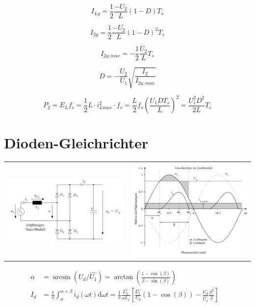 \documentclass[10pt,landscape]{scrartcl}
\newcommand{\eqn}[3]
{
  \begin{minipage}[#1]{#2}
    \[ #3 \]
  \end{minipage}
}
\begin{document}
\begin{multicols}{2}
\eqn{h}{0.3\linewidth}{ I_{Lg} = \frac{1}{2} \frac{-U_2}{L}(1-D)T_s }
\eqn{h}{0.3\linewidth}{ I_{2g} = \frac{1}{2} \frac{-U_2}{L}(1-D)^2T_s }
\eqn{h}{0.3\linewidth}{ I_{2g,max} = -\frac{1}{2} \frac{U_2}{L}T_s }

\eqn{h}{0.3\linewidth}{ D = -\frac{U_2}{U_1} \sqrt{\frac{I_2}{I_{2g,max}}} }
\eqn{h}{0.65\linewidth}{ P_2 = E_L f_s = \frac{1}{2}L \cdot i_{Lmax}^2 \cdot f_s = \frac{L}{2} f_s \left( \frac{U_1 D T_s}{L} \right)^2 = \frac{U_1^2D^2}{2L}T_s }


\vfill\null
\columnbreak
\section{Dioden-Gleichrichter}

\begin{tabular}{c c}
  \includegraphics[width=0.49\linewidth]{img/dioderect/sch.png}%
  &
  \includegraphics[width=0.49\linewidth]{img/dioderect/dia.png}%
\end{tabular}

\begin{align*}
  \alpha &= \arcsin(U_d/\hat{U_1}) = \arctan\left(\frac{1-\cos(\beta)}{\beta-\sin(\beta)}\right) & \\
  I_d &= \frac{1}{\pi}\int_{\alpha}^{\alpha+\beta}i_d(\omega t)\mathrm{d}\omega t = \frac{1}{\pi}\frac{\hat{U_1}}{\omega L_1} \left[\frac{\hat{U_1}}{U_d}(1-\cos(\beta))-\frac{U_d}{\hat{U_1}}\frac{\beta^2}{2}\right]
\end{align*}




\end{multicols}
\end{document}
